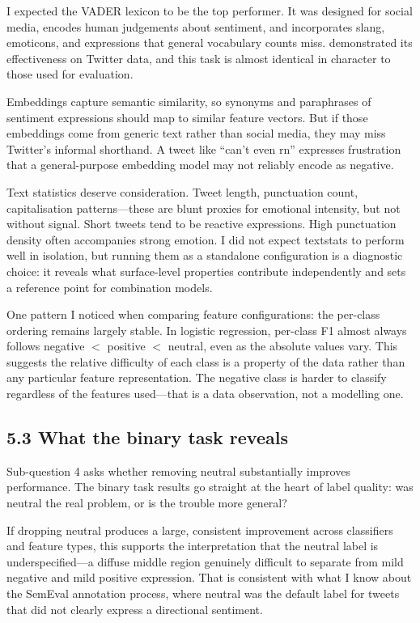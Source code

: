\documentclass[12pt]{article}
\begin{document}
I expected the VADER lexicon to be the top performer. It was designed for social media, encodes human judgements about sentiment, and incorporates slang, emoticons, and expressions that general vocabulary counts miss. \citet{hutto2014vader} demonstrated its effectiveness on Twitter data, and this task is almost identical in character to those used for evaluation.

Embeddings capture semantic similarity, so synonyms and paraphrases of sentiment expressions should map to similar feature vectors. But if those embeddings come from generic text rather than social media, they may miss Twitter's informal shorthand. A tweet like ``can't even rn'' expresses frustration that a general-purpose embedding model may not reliably encode as negative.

Text statistics deserve consideration. Tweet length, punctuation count, capitalisation patterns---these are blunt proxies for emotional intensity, but not without signal. Short tweets tend to be reactive expressions. High punctuation density often accompanies strong emotion. I did not expect textstats to perform well in isolation, but running them as a standalone configuration is a diagnostic choice: it reveals what surface-level properties contribute independently and sets a reference point for combination models.

One pattern I noticed when comparing feature configurations: the per-class ordering remains largely stable. In logistic regression, per-class F1 almost always follows negative $<$ positive $<$ neutral, even as the absolute values vary. This suggests the relative difficulty of each class is a property of the data rather than any particular feature representation. The negative class is harder to classify regardless of the features used---that is a data observation, not a modelling one.



\subsection*{5.3 What the binary task reveals}



Sub-question 4 asks whether removing neutral substantially improves performance. The binary task results go straight at the heart of label quality: was neutral the real problem, or is the trouble more general?

If dropping neutral produces a large, consistent improvement across classifiers and feature types, this supports the interpretation that the neutral label is underspecified---a diffuse middle region genuinely difficult to separate from mild negative and mild positive expression. That is consistent with what I know about the SemEval annotation process, where neutral was the default label for tweets that did not clearly express a directional sentiment.
\end{document}
